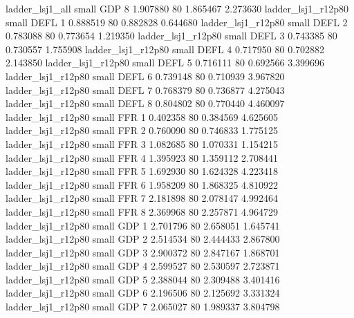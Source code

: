          ladder_lsj1_all      small      GDP                 8 1.907880 80       1.865467           2.273630
      ladder_lsj1_r12p80      small     DEFL                 1 0.888519 80       0.882828           0.644680
      ladder_lsj1_r12p80      small     DEFL                 2 0.783088 80       0.773654           1.219350
      ladder_lsj1_r12p80      small     DEFL                 3 0.743385 80       0.730557           1.755908
      ladder_lsj1_r12p80      small     DEFL                 4 0.717950 80       0.702882           2.143850
      ladder_lsj1_r12p80      small     DEFL                 5 0.716111 80       0.692566           3.399696
      ladder_lsj1_r12p80      small     DEFL                 6 0.739148 80       0.710939           3.967820
      ladder_lsj1_r12p80      small     DEFL                 7 0.768379 80       0.736877           4.275043
      ladder_lsj1_r12p80      small     DEFL                 8 0.804802 80       0.770440           4.460097
      ladder_lsj1_r12p80      small      FFR                 1 0.402358 80       0.384569           4.625605
      ladder_lsj1_r12p80      small      FFR                 2 0.760090 80       0.746833           1.775125
      ladder_lsj1_r12p80      small      FFR                 3 1.082685 80       1.070331           1.154215
      ladder_lsj1_r12p80      small      FFR                 4 1.395923 80       1.359112           2.708441
      ladder_lsj1_r12p80      small      FFR                 5 1.692930 80       1.624328           4.223418
      ladder_lsj1_r12p80      small      FFR                 6 1.958209 80       1.868325           4.810922
      ladder_lsj1_r12p80      small      FFR                 7 2.181898 80       2.078147           4.992464
      ladder_lsj1_r12p80      small      FFR                 8 2.369968 80       2.257871           4.964729
      ladder_lsj1_r12p80      small      GDP                 1 2.701796 80       2.658051           1.645741
      ladder_lsj1_r12p80      small      GDP                 2 2.514534 80       2.444433           2.867800
      ladder_lsj1_r12p80      small      GDP                 3 2.900372 80       2.847167           1.868701
      ladder_lsj1_r12p80      small      GDP                 4 2.599527 80       2.530597           2.723871
      ladder_lsj1_r12p80      small      GDP                 5 2.388044 80       2.309488           3.401416
      ladder_lsj1_r12p80      small      GDP                 6 2.196506 80       2.125692           3.331324
      ladder_lsj1_r12p80      small      GDP                 7 2.065027 80       1.989337           3.804798
